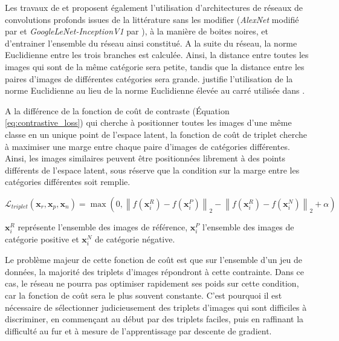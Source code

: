 Les travaux de \cite{wang_learning_2014} et \cite{schroff_facenet_2015} proposent également l'utilisation d'architectures de réseaux de convolutions profonds issues de la littérature sans les modifier (\textit{AlexNet} modifié par \cite{zeiler_visualizing_2013} et \textit{GoogleLeNet-InceptionV1} par \cite{szegedy_going_2014}), à la manière de boites noires, et d'entrainer l'ensemble du réseau ainsi constitué.
A la suite du réseau, la norme Euclidienne entre les trois branches est calculée.
Ainsi, la distance entre toutes les images qui sont de la même catégorie sera petite, tandis que la distance entre les paires d'images de différentes catégories sera grande.
\cite{wu_sampling_2017} justifie l'utilisation de la norme Euclidienne au lieu de la norme Euclidienne élevée au carré utilisée dans \cite{schroff_facenet_2015}.

A la différence de la fonction de coût de contraste (Équation \ref{eq:contrastive_loss}) qui cherche à positionner toutes les images d'une même classe en un unique point de l'espace latent, la fonction de coût de triplet cherche à maximiser une marge entre chaque paire d'images de catégories différentes.
Ainsi, les images similaires peuvent être positionnées librement à des points différents de l'espace latent, sous réserve que la condition sur la marge entre les catégories différentes soit remplie.

\begin{equation} \label{eq:triplet_loss}
\mathcal{L}_{triplet}\left(\mathbf{x}_r, \mathbf{x}_p, \mathbf{x}_n\right) = \operatorname{max}\left(0,  \left\|f\left(\mathbf{x}_{i}^{R}\right)-f\left(\mathbf{x}_{i}^{P}\right)\right\|_{2}-\left\|f\left(\mathbf{x}_{i}^{R}\right)-f\left(\mathbf{x}_{i}^{N}\right)\right\|_{2} + \alpha\right)
\end{equation}

$\mathbf{x}_{i}^{R}$ représente l'ensemble des images de référence, $\mathbf{x}_{i}^{P}$ l'ensemble des images de catégorie positive et $\mathbf{x}_{i}^{N}$ de catégorie négative.

Le problème majeur de cette fonction de coût est que sur l'ensemble d'un jeu de données, la majorité des triplets d'images répondront à cette contrainte.
Dans ce cas, le réseau ne pourra pas optimiser rapidement ses poids sur cette condition, car la fonction de coût sera le plus souvent constante.
C'est pourquoi il est nécessaire de sélectionner judicieusement des triplets d'images qui sont difficiles à discriminer, en commençant au début par des triplets faciles, puis en raffinant la difficulté au fur et à mesure de l'apprentissage par descente de gradient.

